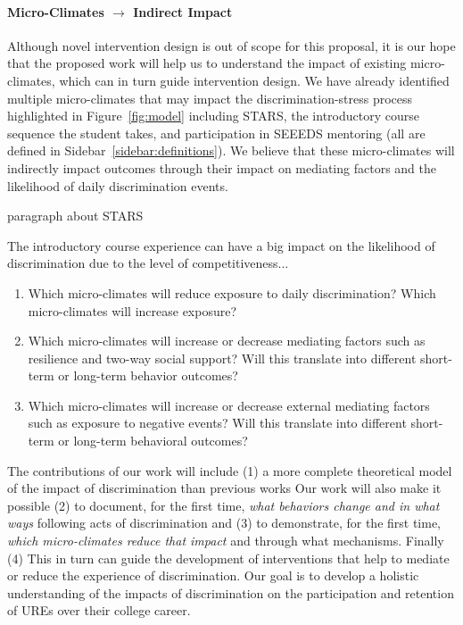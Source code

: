 \paragraph{Micro-Climates $\rightarrow$ Indirect Impact} Although novel intervention design is out of scope for this proposal, it is our hope that the proposed work will help us to understand the impact of existing micro-climates, which can in turn guide intervention design. We have already identified multiple micro-climates that may impact the discrimination-stress process highlighted in Figure~\ref{fig:model} including STARS, the introductory course sequence the student takes, and participation in SEEEDS mentoring (all are defined in Sidebar~\ref{sidebar:definitions}). We believe that these micro-climates will indirectly impact outcomes through their impact on mediating factors and the likelihood of daily discrimination events. 
 
\begin{WrapText}
\begin{description}[leftmargin=1cm]
\item[STARS] paragraph about STARS
\item[Introductory Sequence] The introductory course experience can have a big impact on the likelihood of discrimination due to the level of competitiveness...
\item[SEEEDS mentoring]
\item[FIGS?]
\end{description}
\end{WrapText}

\begin{enumerate}[start=7,label={\bfseries RQ\arabic*}, leftmargin=1cm]
    \item \label{itm:mc-daily-discrimination} Which micro-climates will reduce exposure to daily discrimination? Which micro-climates will increase exposure?
    \item \label{itm:mc-internal-mediators} Which micro-climates will increase or decrease mediating factors such as resilience and two-way social support? Will this translate into different short-term or long-term behavior outcomes?
    \item \label{itm:mc-external-mediators} Which micro-climates will increase or decrease external mediating factors such as exposure to negative events? Will this translate into different short-term or long-term behavioral outcomes?
\end{enumerate}
 
The contributions of our work will include (1) a more complete theoretical model of the impact of discrimination than previous works
  Our work will also make it possible (2) to document, for the first time, \textit{what behaviors change and in what ways} following acts of discrimination and (3) to demonstrate, for the first time, \textit{which micro-climates reduce that impact} and through what mechanisms. Finally (4) This in turn can guide the development of interventions that help to mediate or reduce the experience of discrimination.
Our goal is to develop a holistic understanding of the impacts of discrimination on the participation and retention of UREs over their college career. 

